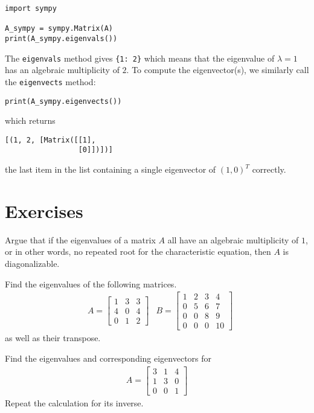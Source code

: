 \begin{lstlisting}
import sympy

A_sympy = sympy.Matrix(A)
print(A_sympy.eigenvals())
\end{lstlisting}
The \verb|eigenvals| method gives \verb|{1: 2}| which means that the eigenvalue of $\lambda = 1$ has an algebraic multiplicity of $2$. To compute the eigenvector(s), we similarly call the \verb|eigenvects| method:
\begin{lstlisting}
print(A_sympy.eigenvects())    
\end{lstlisting}
which returns 
\begin{lstlisting}
[(1, 2, [Matrix([[1],
                 [0]])])]
\end{lstlisting}
the last item in the list containing a single eigenvector of $(1,0)^T$ correctly.

\section{Exercises}

\begin{Exercise}
Argue that if the eigenvalues of a matrix $A$ all have an algebraic multiplicity of $1$, or in other words, no repeated root for the characteristic equation, then $A$ is diagonalizable. 
\end{Exercise}

\begin{Exercise}
Find the eigenvalues of the following matrices.
\begin{align*}
&A =
\begin{bmatrix}
1 & 3 & 3\\
4 & 0 & 4\\
0 & 1 & 2
\end{bmatrix}
&B =
\begin{bmatrix}
1 & 2 & 3 & 4\\
0 & 5 & 6 & 7\\
0 & 0 & 8 & 9\\
0 & 0 & 0 & 10
\end{bmatrix}
\end{align*}
as well as their transpose.
\end{Exercise}

\begin{Exercise}
Find the eigenvalues and corresponding eigenvectors for
\begin{align*}
A =
\begin{bmatrix}
3 & 1 & 4\\
1 & 3 & 0\\
0 & 0 & 1
\end{bmatrix}
\end{align*}
Repeat the calculation for its inverse.
\end{Exercise}

